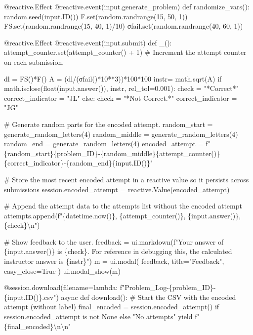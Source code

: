 \documentclass[
  letterpaper,
  DIV=11,
  numbers=noendperiod]{scrreprt}
\newenvironment{Shaded}{\begin{snugshade}}{\end{snugshade}}
\newcommand{\NormalTok}[1]{\textcolor[rgb]{0.00,0.23,0.31}{#1}}
\begin{document}
\begin{Shaded}
\begin{Highlighting}[]
\NormalTok{    @reactive.Effect}
\NormalTok{    @reactive.event(input.generate\_problem)}
\NormalTok{    def randomize\_vars():}
\NormalTok{        random.seed(input.ID())}
\NormalTok{        F.set(random.randrange(15, 50, 1))}
\NormalTok{        FS.set(random.randrange(15, 40, 1)/10)}
\NormalTok{        σfail.set(random.randrange(40, 60, 1))}
        

\NormalTok{    @reactive.Effect}
\NormalTok{    @reactive.event(input.submit)}
\NormalTok{    def \_():}
\NormalTok{        attempt\_counter.set(attempt\_counter() + 1)  \# Increment the attempt counter on each submission.}
    
\NormalTok{        dl = FS()*F()}
\NormalTok{        A = (dl/(σfail()*10**3))*100*100}
\NormalTok{        instr= math.sqrt(A)}
\NormalTok{        if math.isclose(float(input.answer()), instr, rel\_tol=0.001):}
\NormalTok{            check = "*Correct*"}
\NormalTok{            correct\_indicator = "JL"}
\NormalTok{        else:}
\NormalTok{            check = "*Not Correct.*"}
\NormalTok{            correct\_indicator = "JG"}

\NormalTok{        \# Generate random parts for the encoded attempt.}
\NormalTok{        random\_start = generate\_random\_letters(4)}
\NormalTok{        random\_middle = generate\_random\_letters(4)}
\NormalTok{        random\_end = generate\_random\_letters(4)}
\NormalTok{        encoded\_attempt = f"\{random\_start\}\{problem\_ID\}{-}\{random\_middle\}\{attempt\_counter()\}\{correct\_indicator\}{-}\{random\_end\}\{input.ID()\}"}

\NormalTok{        \# Store the most recent encoded attempt in a reactive value so it persists across submissions}
\NormalTok{        session.encoded\_attempt = reactive.Value(encoded\_attempt)}

\NormalTok{        \# Append the attempt data to the attempts list without the encoded attempt}
\NormalTok{        attempts.append(f"\{datetime.now()\}, \{attempt\_counter()\}, \{input.answer()\}, \{check\}\textbackslash{}n")}

\NormalTok{        \# Show feedback to the user.}
\NormalTok{        feedback = ui.markdown(f"Your answer of \{input.answer()\} is \{check\}. For reference in debugging this, the calculated instructor answer is \{instr\}")}
\NormalTok{        m = ui.modal(}
\NormalTok{            feedback,}
\NormalTok{            title="Feedback",}
\NormalTok{            easy\_close=True}
\NormalTok{        )}
\NormalTok{        ui.modal\_show(m)}

\NormalTok{    @session.download(filename=lambda: f"Problem\_Log{-}\{problem\_ID\}{-}\{input.ID()\}.csv")}
\NormalTok{    async def download():}
\NormalTok{        \# Start the CSV with the encoded attempt (without label)}
\NormalTok{        final\_encoded = session.encoded\_attempt() if session.encoded\_attempt is not None else "No attempts"}
\NormalTok{        yield f"\{final\_encoded\}\textbackslash{}n\textbackslash{}n"}
        

\end{Highlighting}
\end{Shaded}
\end{document}
